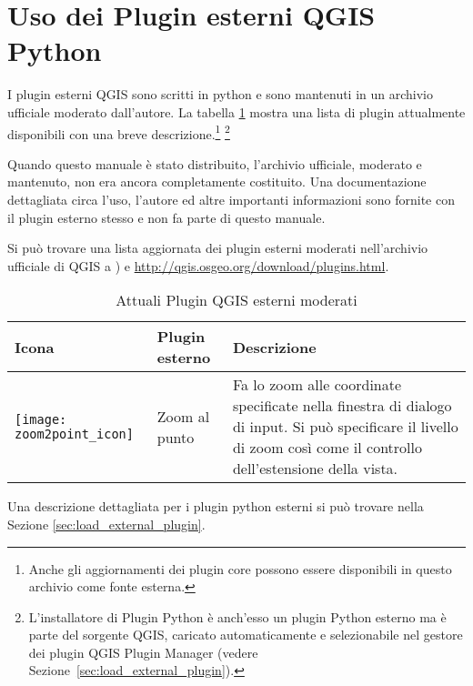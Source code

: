 
\section{Uso dei Plugin esterni QGIS Python}\label{sec:external_plugins}


I plugin esterni QGIS sono scritti in python e sono mantenuti in un archivio ufficiale moderato dall'autore. La tabella \ref{tab:external_plugins} mostra una lista di plugin attualmente disponibili con una breve descrizione.\footnote{Anche gli aggiornamenti dei plugin core possono essere disponibili in questo archivio come fonte esterna.} 
\footnote{L'installatore di Plugin Python è anch'esso un plugin Python esterno ma è parte del sorgente QGIS, caricato automaticamente e selezionabile nel gestore dei plugin QGIS Plugin Manager (vedere Sezione~\ref{sec:load_external_plugin}).}

Quando questo manuale è stato distribuito, l'archivio ufficiale, moderato e mantenuto, non era ancora completamente costituito. Una documentazione dettagliata circa l'uso, l'autore ed altre importanti informazioni sono fornite con il plugin esterno stesso e non fa parte di questo manuale.

Si può trovare una lista aggiornata dei plugin esterni moderati nell'archivio ufficiale di QGIS a ) e \url{http://qgis.osgeo.org/download/plugins.html}. 

\begin{table}[H]
\centering
\caption{Attuali Plugin QGIS esterni moderati}\label{tab:external_plugins}\medskip
\small
 \begin{tabular}{|l|l|p{4in}|}
\hline \textbf{Icona} & \textbf{Plugin esterno} & \textbf{Descrizione}\\
\hline
\texttt{[image: zoom2point\_icon]}
 & Zoom al punto \index{plugin!zoom al punto} & Fa lo zoom alle coordinate specificate nella finestra di dialogo di input. Si può specificare il livello di zoom così come il controllo dell'estensione della vista.\\
\hline
\end{tabular}
\end{table}

Una descrizione dettagliata per i plugin python esterni si può trovare nella 
Sezione \ref{sec:load_external_plugin}.


